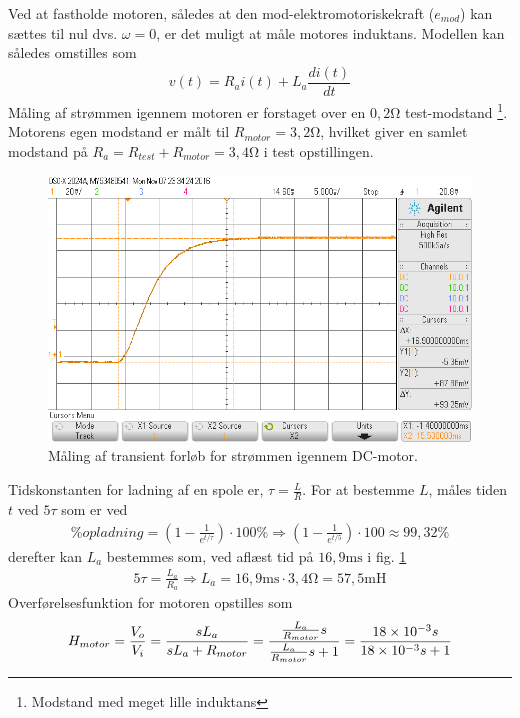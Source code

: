 Ved at fastholde motoren, således at den mod-elektromotoriskekraft ($e_{mod}$) kan sættes til nul dvs. $\omega = 0$, er det muligt at måle motores induktans.
Modellen kan således omstilles som
\begin{align}
	v(t) = R_ai(t) + L_a\dfrac{di(t)}{dt}
\end{align}
Måling af strømmen igennem motoren er forstaget over en $0,2 \si{\ohm}$ test-modstand
\footnote{Modstand med meget lille induktans}.
Motorens egen modstand er målt til $R_{motor} = 3,2 \si{\ohm}$, hvilket giver en samlet modstand på $R_a = R_{test} + R_{motor} = 3,4 \si{\ohm}$ i test opstillingen. 
\begin{figure}[h!]
	\centering
	\includegraphics[width=.8\textwidth]{billeder/motor_L.png}
	\caption{Måling af transient forløb for strømmen igennem DC-motor.}
	\label{fig:motor_dynamik_scoop}
\end{figure}
Tidskonstanten for ladning af en spole er, $\tau = \frac{L}{R}$.
For at bestemme $L$, måles tiden $t$ ved $5\tau$ som er ved
\begin{align}
	\% opladning = \left( 1 - \frac{1}{e^{t/\tau}} \right) \cdot 100\% \Rightarrow  \left( 1 - \frac{1}{e^{t/5}} \right) \cdot 100 \approx 99,32\% 
\end{align}
derefter kan $L_a$ bestemmes som, ved aflæst tid på $16,9\si{\milli\second}$ i fig. \ref{fig:motor_dynamik_scoop} 
\begin{align}
	5\tau = \frac{L_a}{R_a} \Rightarrow L_a = 16,9\si{\milli\second} \cdot 3,4 \si{\ohm} = 57,5 \si{\milli\henry}
\end{align}
Overførelsesfunktion for motoren opstilles som
\begin{align}
H_{motor} = \frac{V_o}{V_i} = \frac{s L_a}{s L_a + R_{motor}} = \frac{ \frac{L_a}{R_{motor}}s}{ \frac{L_a}{R_{motor}}s +1} = \frac{\num{18E-3}s}{\num{18E-3}s +1} \label{eq:motor_trans}
\end{align}  



